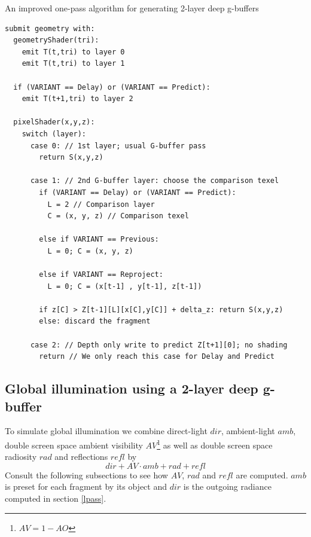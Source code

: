 \documentclass{ACGSeminar}
\begin{document}
		\begin{algorithm} \label{alg:one_pass_strawman} \caption{An improved one-pass algorithm for generating 2-layer deep g-buffers}
		\begin{lstlisting}[frame=single]
submit geometry with:
  geometryShader(tri):
    emit T(t,tri) to layer 0
    emit T(t,tri) to layer 1

  if (VARIANT == Delay) or (VARIANT == Predict):
    emit T(t+1,tri) to layer 2

  pixelShader(x,y,z):
    switch (layer):
      case 0: // 1st layer; usual G-buffer pass
        return S(x,y,z)

      case 1: // 2nd G-buffer layer: choose the comparison texel
        if (VARIANT == Delay) or (VARIANT == Predict):
          L = 2 // Comparison layer
          C = (x, y, z) // Comparison texel

        else if VARIANT == Previous:
          L = 0; C = (x, y, z)

        else if VARIANT == Reproject:
          L = 0; C = (x[t-1] , y[t-1], z[t-1])

        if z[C] > Z[t-1][L][x[C],y[C]] + delta_z: return S(x,y,z)
        else: discard the fragment

      case 2: // Depth only write to predict Z[t+1][0]; no shading
        return // We only reach this case for Delay and Predict
		\end{lstlisting}
		\end{algorithm}
	\subsection{Global illumination using a 2-layer deep g-buffer} \label{gi}
		To simulate global illumination we combine direct-light $dir$, ambient-light $amb$, double screen space ambient visibility $AV$\footnote{$AV = 1-AO$} as well as double screen space radiosity $rad$ and reflections $refl$ by \cite{RSM} \cite{TSTMT}
		$$ dir + AV \cdot amb + rad + refl $$
		Consult the following subsections to see how $AV$, $rad$ and $refl$ are computed. $amb$ is preset for each fragment by its object and $dir$ is the outgoing radiance computed in section \ref{lpass}.%
\end{document}
